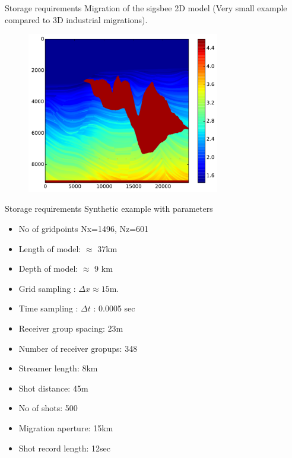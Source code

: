 \documentclass[xcolor=dvipsnames,notes]{beamer}
\begin{document}
\begin{frame}{Storage requirements}
Migration of the sigsbee 2D model (Very small example
compared to 3D industrial migrations).
\begin{figure}
\includegraphics[width=0.75\textwidth]{Fig/vp-original.pdf}
\end{figure}
\end{frame}
\begin{frame}{Storage requirements}
Synthetic example with parameters
\begin{itemize}
\item No of gridpoints Nx=1496, Nz=601
\item Length of model: $\approx$ 37km
\item Depth of model:  $\approx$ 9 km
\item Grid sampling : $\Delta x \approx 15$m.
\item Time sampling : $\Delta t$ : 0.0005 sec
\item Receiver group spacing: 23m
\item Number of receiver gropups: 348
\item Streamer length: 8km
\item Shot distance: 45m
\item No of shots: 500
\item Migration aperture: 15km
\item Shot record length: 12sec
\end{itemize}
\end{frame}
\end{document}
